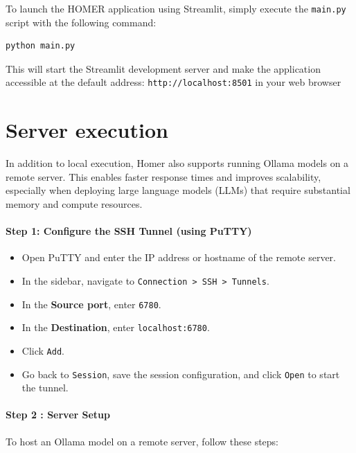 \documentclass[11pt,a4paper]{report}
\begin{document}
To launch the HOMER application using Streamlit, simply execute the \texttt{main.py} script with the following command:

\begin{lstlisting}
python main.py
\end{lstlisting}

This will start the Streamlit development server and make the application accessible at the default address: \texttt{http://localhost:8501} in your web browser


\section{Server execution}

In addition to local execution, Homer also supports running Ollama models on a remote server. This enables faster response times and improves scalability, especially when deploying large language models (LLMs) that require substantial memory and compute resources.

\paragraph{Step 1: Configure the SSH Tunnel (using PuTTY)}
\begin{itemize}
    \item Open PuTTY and enter the IP address or hostname of the remote server.
    \item In the sidebar, navigate to \texttt{Connection > SSH > Tunnels}.
    \item In the \textbf{Source port}, enter \texttt{6780}.
    \item In the \textbf{Destination}, enter \texttt{localhost:6780}.
    \item Click \texttt{Add}.
    \item Go back to \texttt{Session}, save the session configuration, and click \texttt{Open} to start the tunnel.
\end{itemize}


\paragraph{Step 2 : Server Setup}

To host an Ollama model on a remote server, follow these steps:
\end{document}
